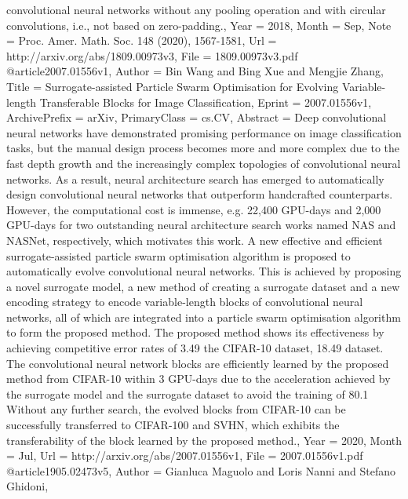 {{{{{convolutional neural networks without any pooling operation and with circular
convolutions, i.e., not based on zero-padding.},
Year          = {2018},
Month         = {Sep},
Note          = {Proc. Amer. Math. Soc. 148 (2020), 1567-1581},
Url           = {http://arxiv.org/abs/1809.00973v3},
File          = {1809.00973v3.pdf}
}
@article{2007.01556v1,
Author        = {Bin Wang and Bing Xue and Mengjie Zhang},
Title         = {Surrogate-assisted Particle Swarm Optimisation for Evolving
  Variable-length Transferable Blocks for Image Classification},
Eprint        = {2007.01556v1},
ArchivePrefix = {arXiv},
PrimaryClass  = {cs.CV},
Abstract      = {Deep convolutional neural networks have demonstrated promising performance on
image classification tasks, but the manual design process becomes more and more
complex due to the fast depth growth and the increasingly complex topologies of
convolutional neural networks. As a result, neural architecture search has
emerged to automatically design convolutional neural networks that outperform
handcrafted counterparts. However, the computational cost is immense, e.g.
22,400 GPU-days and 2,000 GPU-days for two outstanding neural architecture
search works named NAS and NASNet, respectively, which motivates this work. A
new effective and efficient surrogate-assisted particle swarm optimisation
algorithm is proposed to automatically evolve convolutional neural networks.
This is achieved by proposing a novel surrogate model, a new method of creating
a surrogate dataset and a new encoding strategy to encode variable-length
blocks of convolutional neural networks, all of which are integrated into a
particle swarm optimisation algorithm to form the proposed method. The proposed
method shows its effectiveness by achieving competitive error rates of 3.49%
the CIFAR-10 dataset, 18.49%
dataset. The convolutional neural network blocks are efficiently learned by the
proposed method from CIFAR-10 within 3 GPU-days due to the acceleration
achieved by the surrogate model and the surrogate dataset to avoid the training
of 80.1%
Without any further search, the evolved blocks from CIFAR-10 can be
successfully transferred to CIFAR-100 and SVHN, which exhibits the
transferability of the block learned by the proposed method.},
Year          = {2020},
Month         = {Jul},
Url           = {http://arxiv.org/abs/2007.01556v1},
File          = {2007.01556v1.pdf}
}
@article{1905.02473v5,
Author        = {Gianluca Maguolo and Loris Nanni and Stefano Ghidoni},
}}}}
